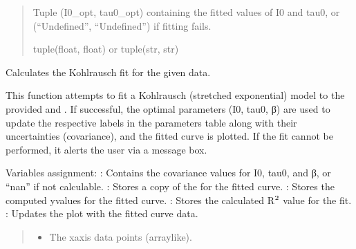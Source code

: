 \documentclass[letterpaper,10pt,english]{sphinxmanual}
\begin{document}
\begin{fulllineitems}
\begin{fulllineitems}
\begin{quote}
\begin{description}
\begin{itemize}
\end{itemize}

\sphinxAtStartPar
Tuple (I0\_opt, tau0\_opt) containing the fitted values of I0 and tau0, or (“Undefined”, “Undefined”) if fitting fails.

\sphinxAtStartPar
tuple(float, float) or tuple(str, str)

\end{description}\end{quote}

\end{fulllineitems}


\begin{fulllineitems}
\label{\detokenize{FLIMGraphics:FLIMGraphics.FLIMGraphic.fitKohlrauschFit}}
\pysigstartsignatures
{}
\pysigstopsignatures
\sphinxAtStartPar
Calculates the Kohlrausch fit for the given data.

\sphinxAtStartPar
This function attempts to fit a Kohlrausch (stretched exponential) model to the provided  and .
If successful, the optimal parameters (I0, tau0, β) are used to update the respective labels in the parameters
table along with their uncertainties (covariance), and the fitted curve is plotted. If the fit cannot be performed,
it alerts the user via a message box.

\sphinxAtStartPar
Variables assignment:
\sphinxhyphen{} : Contains the covariance values for I0, tau0, and β, or “nan” if not calculable.
\sphinxhyphen{} : Stores a copy of the  for the fitted curve.
\sphinxhyphen{} : Stores the computed y\sphinxhyphen{}values for the fitted curve.
\sphinxhyphen{} : Stores the calculated R\(\sp{\text{2}}\) value for the fit.
\sphinxhyphen{} : Updates the plot with the fitted curve data.
\begin{quote}\begin{description}
\begin{itemize}
\item {} 
\sphinxAtStartPar
{} \textendash{} The x\sphinxhyphen{}axis data points (array\sphinxhyphen{}like).


\end{itemize}
\end{description}
\end{quote}
\end{fulllineitems}
\end{fulllineitems}
\end{document}

